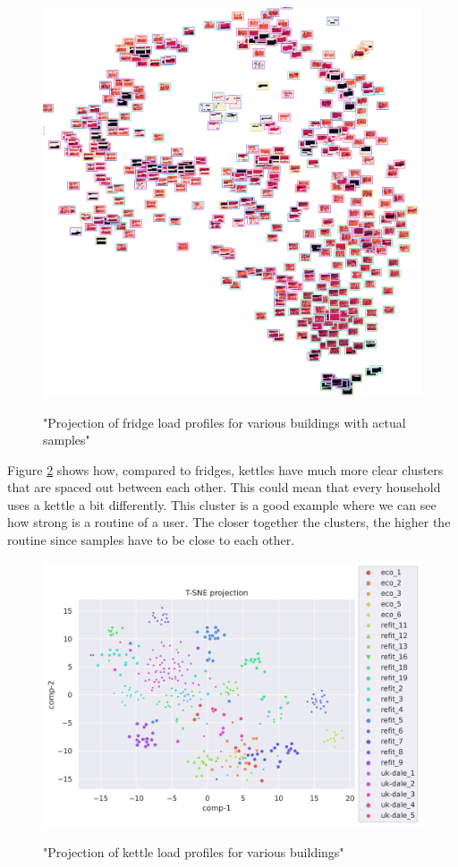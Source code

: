 \begin{figure}[H]
	\centering
	\caption{"Projection of fridge load profiles for various buildings with actual samples"}
	\includegraphics[width=.9\textwidth]{Figures/TSNE/TSNE_per_appliance/all/img_scatter_allfridge_freeezer_fridge freezer.png}
	\label{fig:tsne_pa_img_scatter_all_fridge}
\end{figure}

Figure \ref{fig:tsne_pa_scatter_all_kettle} shows how,
compared to fridges, kettles have much more clear clusters that are spaced out between each other. 
This could mean that every household uses a kettle a bit differently.
This cluster is a good example where we can see how strong is a routine of a user.
The closer together the clusters, the higher the routine since samples have to be 
close to each other.

\begin{figure}[H]
	\centering
	\caption{"Projection of kettle load profiles for various buildings"}
	\includegraphics[width=1.2\textwidth]{Figures/TSNE/TSNE_per_appliance/all/scatter_all_kettle.png}
	\label{fig:tsne_pa_scatter_all_kettle}
\end{figure}


